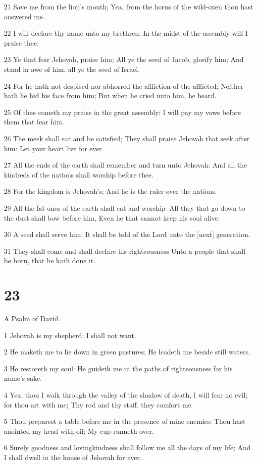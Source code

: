 \par 21 Save me from the lion's mouth; Yea, from the horns of the wild-oxen thou hast answered me.
\par 22 I will declare thy name unto my brethren: In the midst of the assembly will I praise thee.
\par 23 Ye that fear Jehovah, praise him; All ye the seed of Jacob, glorify him; And stand in awe of him, all ye the seed of Israel.
\par 24 For he hath not despised nor abhorred the affliction of the afflicted; Neither hath he hid his face from him; But when he cried unto him, he heard.
\par 25 Of thee cometh my praise in the great assembly: I will pay my vows before them that fear him.
\par 26 The meek shall eat and be satisfied; They shall praise Jehovah that seek after him: Let your heart live for ever.
\par 27 All the ends of the earth shall remember and turn unto Jehovah; And all the kindreds of the nations shall worship before thee.
\par 28 For the kingdom is Jehovah's; And he is the ruler over the nations.
\par 29 All the fat ones of the earth shall eat and worship: All they that go down to the dust shall bow before him, Even he that cannot keep his soul alive.
\par 30 A seed shall serve him; It shall be told of the Lord unto the [next] generation.
\par 31 They shall come and shall declare his righteousness Unto a people that shall be born, that he hath done it.

\chapter{23}

\par A Psalm of David.

\par 1 Jehovah is my shepherd; I shall not want.
\par 2 He maketh me to lie down in green pastures; He leadeth me beside still waters.
\par 3 He restoreth my soul: He guideth me in the paths of righteousness for his name's sake.
\par 4 Yea, thou I walk through the valley of the shadow of death, I will fear no evil; for thou art with me; Thy rod and thy staff, they comfort me.
\par 5 Thou preparest a table before me in the presence of mine enemies: Thou hast anointed my head with oil; My cup runneth over.
\par 6 Surely goodness and lovingkindness shall follow me all the days of my life; And I shall dwell in the house of Jehovah for ever.

